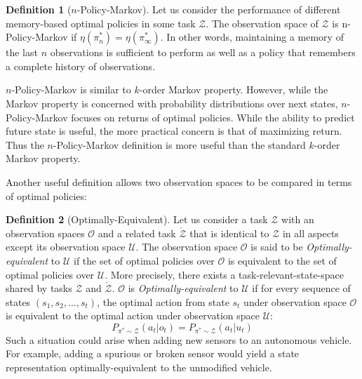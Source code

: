 \documentclass{article} %
\theoremstyle{definition}
\newtheorem{definition}{Definition}[section]
\begin{document}
\begin{definition}[$n$-Policy-Markov]
Let us consider the performance of different memory-based optimal
policies in some task $\mathcal{Z}$. The observation space of
$\mathcal{Z}$ is n-Policy-Markov if $\eta(\pi^*_n) =
\eta(\pi^*_\infty)$. In other words, maintaining a memory of the last
$n$ observations is sufficient to perform as well as a policy that
remembers a complete history of observations.

$n$-Policy-Markov is similar to $k$-order Markov property. However,
while the Markov property is concerned with probability distributions
over next states, $n$-Policy-Markov focuses on returns of optimal
policies. While the ability to predict future state is useful, the
more practical concern is that of maximizing return. Thus the
$n$-Policy-Markov definition is more useful than the standard
$k$-order Markov property.
\end{definition}

Another useful definition allows two observation spaces to be compared
in terms of optimal policies:

\begin{definition}[Optimally-Equivalent]
\label{def:opt-equiv}
Let us consider a task $\mathcal{Z}$ with an observation spaces
$\mathcal{O}$ and a related task $\mathring{\mathcal{Z}}$ that is
identical to $\mathcal{Z}$ in all aspects except its observation space
$\mathcal{U}$. The observation space $\mathcal{O}$ is said to be
\textit{Optimally-equivalent} to $\mathcal{U}$ if the set of optimal
policies over $\mathcal{O}$ is equivalent to the set of optimal
policies over $\mathcal{U}$. More precisely, there exists a
task-relevant-state-space shared by tasks $\mathcal{Z}$ and
$\mathring{\mathcal{Z}}$. $\mathcal{O}$ is
\textit{Optimally-equivalent} to $\mathcal{U}$ if for every sequence
of states $(s_1, s_2, \dots, s_t)$, the optimal action from state
$s_t$ under observation space $\mathcal{O}$ is equivalent to the
optimal action under observation space $\mathcal{U}$:
\[
P_{\pi^* \sim \mathcal{Z}}(a_t | o_{t}) = P_{\pi^* \sim {\mathcal{Z}}}(a_t | u_{t})
\]
Such a situation could arise when adding new sensors to an autonomous
vehicle. For example, adding a spurious or broken sensor would yield a
state representation optimally-equivalent to the unmodified vehicle.
\end{definition}
\end{document}
